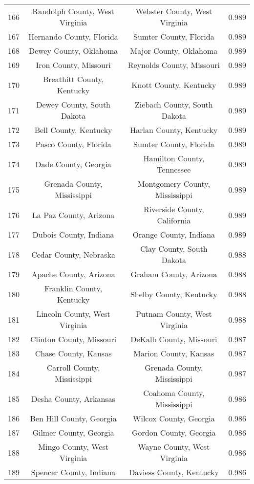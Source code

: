 \begin{longtable}{cccc}
  166 & Randolph County, West Virginia & Webster County, West Virginia & 0.989 \\ 
  167 & Hernando County, Florida & Sumter County, Florida & 0.989 \\ 
  168 & Dewey County, Oklahoma & Major County, Oklahoma & 0.989 \\ 
  169 & Iron County, Missouri & Reynolds County, Missouri & 0.989 \\ 
  170 & Breathitt County, Kentucky & Knott County, Kentucky & 0.989 \\ 
  171 & Dewey County, South Dakota & Ziebach County, South Dakota & 0.989 \\ 
  172 & Bell County, Kentucky & Harlan County, Kentucky & 0.989 \\ 
  173 & Pasco County, Florida & Sumter County, Florida & 0.989 \\ 
  174 & Dade County, Georgia & Hamilton County, Tennessee & 0.989 \\ 
  175 & Grenada County, Mississippi & Montgomery County, Mississippi & 0.989 \\ 
  176 & La Paz County, Arizona & Riverside County, California & 0.989 \\ 
  177 & Dubois County, Indiana & Orange County, Indiana & 0.989 \\ 
  178 & Cedar County, Nebraska & Clay County, South Dakota & 0.988 \\ 
  179 & Apache County, Arizona & Graham County, Arizona & 0.988 \\ 
  180 & Franklin County, Kentucky & Shelby County, Kentucky & 0.988 \\ 
  181 & Lincoln County, West Virginia & Putnam County, West Virginia & 0.988 \\ 
  182 & Clinton County, Missouri & DeKalb County, Missouri & 0.987 \\ 
  183 & Chase County, Kansas & Marion County, Kansas & 0.987 \\ 
  184 & Carroll County, Mississippi & Grenada County, Mississippi & 0.987 \\ 
  185 & Desha County, Arkansas & Coahoma County, Mississippi & 0.986 \\ 
  186 & Ben Hill County, Georgia & Wilcox County, Georgia & 0.986 \\ 
  187 & Gilmer County, Georgia & Gordon County, Georgia & 0.986 \\ 
  188 & Mingo County, West Virginia & Wayne County, West Virginia & 0.986 \\ 
  189 & Spencer County, Indiana & Daviess County, Kentucky & 0.986 \\ 

\end{longtable}
